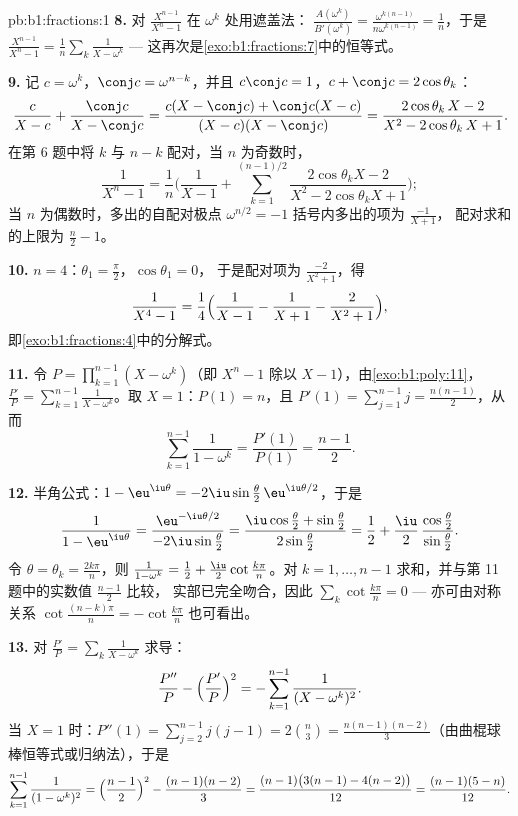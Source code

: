 \begin{solution}{pb:b1:fractions:1}
\textbf{8.} 对 $\frac{X^{n-1}}{X^n - 1}$ 在 $\omega^k$ 处用遮盖法：
$\frac{A(\omega^k)}{B'(\omega^k)} =
\frac{\omega^{k(n-1)}}{n\omega^{k(n-1)}} = \frac1n$，于是
$\frac{X^{n-1}}{X^n-1} = \frac1n\sum_k\frac1{X - \omega^k}$ ---
这再次是\cref{exo:b1:fractions:7}中的恒等式。

\textbf{9.} 记 $c = \omega^k$，$\conj c = \omega^{n-k}$，并且
$c\conj c = 1$，$c + \conj c = 2\cos\theta_k$：
\[
\frac{c}{X - c} + \frac{\conj c}{X - \conj c}
= \frac{c(X - \conj c) + \conj c(X - c)}
{(X - c)(X - \conj c)}
= \frac{2\cos\theta_k\,X - 2}{X^2 - 2\cos\theta_k\,X + 1} .
\]
在第 6 题中将 $k$ 与 $n - k$ 配对，当 $n$ 为奇数时，
\[
\frac1{X^n - 1} = \frac1n\Biggl(\frac1{X-1} +
\sum_{k=1}^{(n-1)/2}
\frac{2\cos\theta_k X - 2}{X^2 - 2\cos\theta_k X + 1}\Biggr) ;
\]
当 $n$ 为偶数时，多出的自配对极点 $\omega^{n/2} = -1$
括号内多出的项为 $\frac{-1}{X+1}$，
配对求和的上限为 $\frac n2 - 1$。

\textbf{10.} $n = 4$：$\theta_1 = \frac\pi2$，$\cos\theta_1 = 0$，
于是配对项为 $\frac{-2}{X^2+1}$，得
\[
\frac1{X^4-1} = \frac14\Bigl(\frac1{X-1} - \frac1{X+1}
- \frac2{X^2+1}\Bigr) ,
\]
即\cref{exo:b1:fractions:4}中的分解式。

\textbf{11.} 令 $P = \prod_{k=1}^{n-1}(X - \omega^k)$（即 $X^n -
1$ 除以 $X - 1$），由\cref{exo:b1:poly:11}，$\frac{P'}P =
\sum_{k=1}^{n-1}\frac1{X-\omega^k}$。取 $X = 1$：$P(1) = n$，且
$P'(1) = \sum_{j=1}^{n-1}j = \frac{n(n-1)}2$，从而
\[
\sum_{k=1}^{n-1}\frac1{1 - \omega^k}
= \frac{P'(1)}{P(1)} = \frac{n-1}2 .
\]

\textbf{12.} 半角公式：$1 - \eu^{\iu\theta} =
-2\iu\sin\frac\theta2\,\eu^{\iu\theta/2}$，于是
\[
\frac1{1 - \eu^{\iu\theta}}
= \frac{\eu^{-\iu\theta/2}}{-2\iu\sin\frac\theta2}
= \frac{\iu\cos\frac\theta2 + \sin\frac\theta2}
{2\sin\frac\theta2}
= \frac12 + \frac\iu2\,
\frac{\cos\frac\theta2}{\sin\frac\theta2} .
\]
令 $\theta = \theta_k = \frac{2k\pi}n$，则 $\frac1{1-\omega^k} =
\frac12 + \frac\iu2\cot\frac{k\pi}n$。对 $k = 1, \dots,
n-1$ 求和，并与第 11 题中的实数值 $\frac{n-1}2$ 比较，
实部已完全吻合，因此
$\sum_k\cot\frac{k\pi}n = 0$ --- 亦可由对称关系 $\cot\frac{(n-k)
\pi}n = -\cot\frac{k\pi}n$ 也可看出。

\textbf{13.} 对 $\frac{P'}P = \sum_k\frac1{X -
\omega^k}$ 求导：
\[
\frac{P''}P - \Bigl(\frac{P'}P\Bigr)^2
= -\sum_{k=1}^{n-1}\frac1{(X - \omega^k)^2} .
\]
当 $X = 1$ 时：$P''(1) = \sum_{j=2}^{n-1}j(j-1) = 2\binom n3 =
\frac{n(n-1)(n-2)}3$（由曲棍球棒恒等式或归纳法），于是
\[
\sum_{k=1}^{n-1}\frac1{(1 - \omega^k)^2}
= \Bigl(\frac{n-1}2\Bigr)^2 - \frac{(n-1)(n-2)}3
= \frac{(n-1)\bigl(3(n-1) - 4(n-2)\bigr)}{12}
= \frac{(n-1)(5-n)}{12} .
\]


\end{solution}
